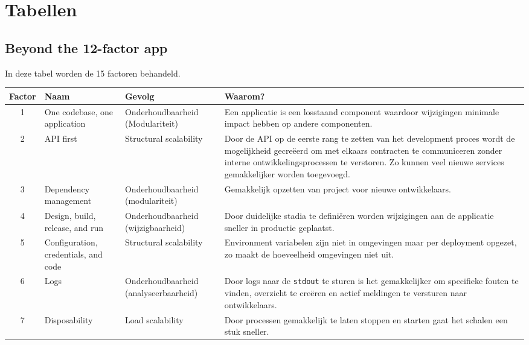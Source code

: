 
\chapter{Tabellen} %

\label{BijlageTabellen} 

\section{Beyond the 12-factor app}

\label{TabelFactors}

In deze tabel worden de 15 factoren behandeld.

\begin{longtable}[c]{c p{3cm} p{3.5cm} p{5.5cm}}
	\toprule
	\textbf{Factor} & \textbf{Naam} & \textbf{Gevolg} & \textbf{Waarom?} \\
	\midrule		
	1 & One codebase, one application & Onderhoudbaarheid (Modulariteit) & Een applicatie is een losstaand component waardoor wijzigingen minimale impact hebben op andere componenten. \\
\hline
	2 & API first & Structural scalability & Door de API op de eerste rang te zetten van het development proces wordt de mogelijkheid gecreëerd om met elkaars contracten te communiceren zonder interne ontwikkelingsprocessen te verstoren. Zo kunnen veel nieuwe services gemakkelijker worden toegevoegd. \\
\hline
	3 & Dependency management & Onderhoudbaarheid (modulariteit) & Gemakkelijk opzetten van project voor nieuwe ontwikkelaars. \\
\hline
	4 & Design, build, release, and run & Onderhoudbaarheid (wijzigbaarheid) & Door duidelijke stadia te definiëren worden wijzigingen aan de applicatie sneller in productie geplaatst. \\
\hline
	5 & Configuration, credentials, and code & Structural scalability & Environment variabelen zijn niet in omgevingen maar per deployment opgezet, zo maakt de hoeveelheid omgevingen niet uit. \\
\hline
	6 & Logs & Onderhoudbaarheid (analyseerbaarheid) & Door logs naar de \texttt{stdout} te sturen is het gemakkelijker om specifieke fouten te vinden, overzicht te creëren en actief meldingen te versturen naar ontwikkelaars. \\
\hline
	7 & Disposability & Load scalability & Door processen gemakkelijk te laten stoppen en starten gaat het schalen een stuk sneller. \\

\end{longtable}

